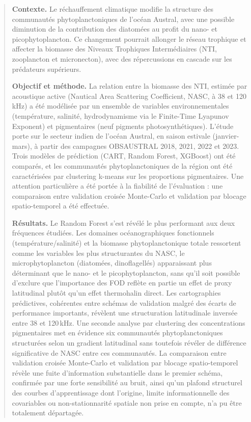 \documentclass[11pt,a4paper,oneside]{report}
\begin{document}
	\clearpage
	\begin{abstract}
		
		\textbf{Contexte.} Le réchauffement climatique modifie la structure des communautés phytoplanctoniques de l'océan Austral, avec une possible diminution de la contribution des diatomées au profit du nano- et picophytoplancton. Ce changement pourrait allonger le réseau trophique et affecter la biomasse des Niveaux Trophiques Intermédiaires (NTI, zooplancton et micronecton), avec des répercussions en cascade sur les prédateurs supérieurs.
		
		\vspace{0.3cm}
		
		\textbf{Objectif et méthode.} La relation entre la biomasse des NTI, estimée par acoustique active (Nautical Area Scattering Coefficient, NASC, à 38 et 120 kHz) a été modélisée par un ensemble de variables environnementales (température, salinité, hydrodynamisme via le Finite-Time Lyapunov Exponent) et pigmentaires (neuf pigments photosynthétiques). L'étude porte sur le secteur indien de l'océan Austral, en saison estivale (janvier-mars), à partir des campagnes OBSAUSTRAL 2018, 2021, 2022 et 2023. Trois modèles de prédiction (CART, Random Forest, XGBoost) ont été comparés, et les communautés phytoplanctoniques de la région ont été caractérisées par clustering k-means sur les proportions pigmentaires. Une attention particulière a été portée à la fiabilité de l'évaluation : une comparaison entre validation croisée Monte-Carlo et validation par blocage spatio-temporel a été effectuée.
		
		\vspace{0.3cm}
		
		\textbf{Résultats.} Le Random Forest s'est révélé le plus performant aux deux fréquences étudiées. Les domaines océanographiques fonctionnels (température/salinité) et la biomasse phytoplanctonique totale ressortent comme les variables les plus structurantes du NASC, le microphytoplancton (diatomées, dinoflagellés) apparaissant plus déterminant que le nano- et le picophytoplancton, sans qu'il soit possible d'exclure que l'importance des FOD reflète en partie un effet de proxy latitudinal plutôt qu'un effet thermohalin direct. Les cartographies prédictives, cohérentes entre schémas de validation malgré des écarts de performance importants, révèlent une structuration latitudinale inversée entre 38 et 120\,kHz. Une seconde analyse par clustering des concentrations pigmentaires met en évidence six communautés phytoplanctoniques structurées selon un gradient latitudinal sans toutefois révéler de différence significative de NASC entre ces communautés. La comparaison entre validation croisée Monte-Carlo et validation par blocage spatio-temporel révèle une fuite d'information substantielle dans le premier schéma, confirmée par une forte sensibilité au bruit, ainsi qu'un plafond structurel des courbes d'apprentissage dont l'origine, limite informationnelle des covariables ou non-stationnarité spatiale non prise en compte, n'a pu être totalement départagée. 
		

\end{abstract}
\end{document}
